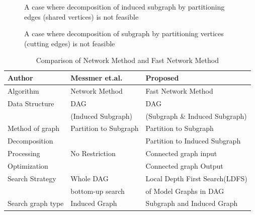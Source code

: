 \begin{enumerate}
\begin{enumerate}
\end{enumerate}





\begin{figure}
\centering

\caption{A case where decomposition of induced subgraph by partitioning edges (shared vertices) is not feasible \label{fig:fig66} }
\end{figure}


\begin{figure}
\centering

\caption{A case where decomposition of subgraph by partitioning vertices (cutting edges) is not feasible \label{fig:fig7} }
\end{figure}


\begin{table}
\begin{center}
\begin{tabular}{|l|l|l|}
\hline
Author  & Messmer et.al.  & Proposed  \\ \hline
Algorithm & Network Method & Fast Network Method \\ \hline
Data Structure & DAG                 & DAG                            \\ 
               &  (Induced Subgraph) &  (Subgraph \& Induced Subgraph) \\ \hline
Method of graph  & Partition to Subgraph  & Partition to Subgraph \\ 
Decomposition    &                        & Partition to Induced Subgraph \\ \hline
Processing    & No Restriction  & Connected graph input                     \\ 
Optimization      &                   & Connected graph Output                 \\ \hline 
Search Strategy & Whole DAG           & Local Depth First Search(LDFS) \\ 
                & bottom-up search          &  of Model Graphs in DAG   \\ \hline
Search graph type & Induced Graph & Subgraph and Induced Graph \\ \hline

\end{tabular}
\caption{ Comparison of Network Method and Fast Network Method \label{tab:table1} }
\end{center}
\end{table}
